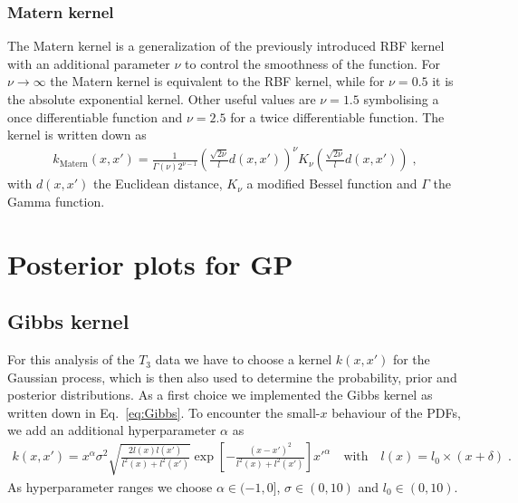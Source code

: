 \documentclass[11pt,a4paper]{article}
\begin{document}
\subsubsection*{Matern kernel} %
The Matern kernel is a generalization of the previously introduced RBF kernel with an additional parameter $\nu$ to control the smoothness of the function. For $\nu \rightarrow \infty$ the Matern kernel is equivalent to the RBF kernel, while for $\nu = 0.5$ it is the absolute exponential kernel. Other useful values are $\nu =1.5$ symbolising a once differentiable function and $\nu = 2.5$ for a twice differentiable function.
The kernel is written down as
%
\begin{align}
    k_\mathrm{Matern} (x, x') = \frac{1}{\Gamma(\nu) 2^{\nu-1}} \left( \frac{\sqrt{2\nu}}{l} d(x, x') \right)^\nu K_\nu \left( \frac{\sqrt{2\nu}}{l} d(x, x') \right) \; ,
    \label{eq:matern}
\end{align}
%
with $d(x, x')$ the Euclidean distance, $K_\nu$ a modified Bessel function and $\Gamma$ the Gamma function. 


\section{Posterior plots for GP}
\subsection{Gibbs kernel}
%
For this analysis of the $T_3$ data we have to choose a kernel $k(x,x')$ for the Gaussian process, which is then also used to determine the probability, prior and posterior distributions. As a first choice we implemented the Gibbs kernel as written down in Eq.~\eqref{eq:Gibbs}. To encounter the small-$x$ behaviour of the PDFs, we add an additional hyperparameter $\alpha$ as
%
\begin{align}
    k(x, x') = x^\alpha \sigma^2 \sqrt{\frac{2l(x) l(x')}{l^2(x)+l^2(x')}} \exp \left[ - \frac{(x-x')^2}{l^2(x)+l^2(x')} \right] x'^\alpha \quad \text{with} \quad l(x) = l_0 \times (x+\delta) \; .
\end{align}
%
As hyperparameter ranges we choose $\alpha \in (-1, 0]$, $\sigma \in (0,10)$ and $l_0 \in (0,10)$. 
%
\end{document}
